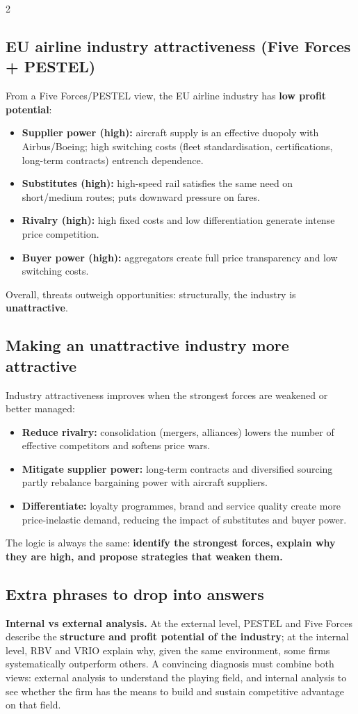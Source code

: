 \documentclass[8pt,landscape,a4paper]{article}
\newcommand{\hlpeach}[1]{\textcolor{eublue}{\textbf{#1}}}
\begin{document}
\begin{multicols}{2}
\subsection*{\hlpeach{EU airline industry attractiveness (Five Forces + PESTEL)}}
From a Five Forces/PESTEL view, the EU airline industry has \textbf{low profit potential}:
\begin{itemize}[leftmargin=*,nosep]
\item \textbf{Supplier power (high):} aircraft supply is an effective duopoly with Airbus/Boeing; high switching costs (fleet standardisation, certifications, long-term contracts) entrench dependence.
\item \textbf{Substitutes (high):} high-speed rail satisfies the same need on short/medium routes; puts downward pressure on fares.
\item \textbf{Rivalry (high):} high fixed costs and low differentiation generate intense price competition.
\item \textbf{Buyer power (high):} aggregators create full price transparency and low switching costs.
\end{itemize}
Overall, threats outweigh opportunities: structurally, the industry is \textbf{unattractive}.

\subsection*{\hlpeach{Making an unattractive industry more attractive}}
Industry attractiveness improves when the strongest forces are weakened or better managed:
\begin{itemize}[leftmargin=*,nosep]
\item \textbf{Reduce rivalry:} consolidation (mergers, alliances) lowers the number of effective competitors and softens price wars.
\item \textbf{Mitigate supplier power:} long-term contracts and diversified sourcing partly rebalance bargaining power with aircraft suppliers.
\item \textbf{Differentiate:} loyalty programmes, brand and service quality create more price-inelastic demand, reducing the impact of substitutes and buyer power.
\end{itemize}
The logic is always the same: \textbf{identify the strongest forces, explain why they are high, and propose strategies that weaken them.}

\subsection*{\hlpeach{Extra phrases to drop into answers}}
\textbf{Internal vs external analysis.} At the external level, PESTEL and Five Forces describe the \textbf{structure and profit potential of the industry}; at the internal level, RBV and VRIO explain why, given the same environment, some firms systematically outperform others. A convincing diagnosis must combine both views: external analysis to understand the playing field, and internal analysis to see whether the firm has the means to build and sustain competitive advantage on that field.


\end{multicols}
\end{document}
